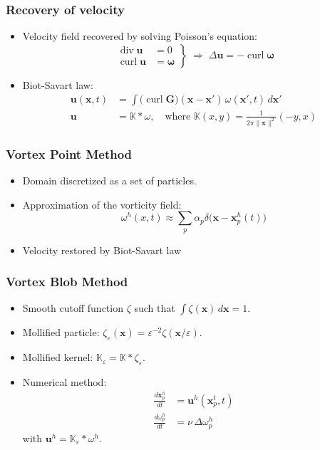\documentclass[12pt,english,dvipsnames]{beamer}
\newcommand{\K}{\mathbb{K}}  %
\renewcommand{\vec}{\mathbf}
\newcommand{\x}{\vec x}      %
\newcommand{\vel}{\vec u}    %
\DeclareMathOperator{\divergence}{div}
\DeclareMathOperator{\curl}{curl}
\providecommand{\norm}[1]{\lVert#1\rVert}
\newcommand{\od}[2]{\frac{d#1}{d#2}}
\begin{document}
  \begin{frame}
    \frametitle{Recovery of velocity}
    \begin{itemize}
      \item Velocity field recovered by solving Poisson's equation:
        \begin{equation}
          \left.
          \begin{split}
            \divergence\vel &= 0 \\
            \curl\vel &= \mathbold\omega
          \end{split}
          \right\}\;\Longrightarrow\;
          Δ\vel = -\curl\mathbold\omega
        \end{equation}
      \item Biot-Savart law:
        \begin{align}
          \vel(\x, t) &=
            \int\bigl(\curl\vec{G}\bigr)(\x - \x')\,ω(\x', t)\,d\x' \\
          \vel &= \K * ω,
            \quad\text{where \(\textstyle\K(x, y) = \frac{1}{2π\norm{\x}^2}(-y, x)\)}
        \end{align}
    \end{itemize}
  \end{frame}

  \begin{frame}
    \frametitle{Vortex Point Method}
    \begin{itemize}
      \item Domain discretized as a set of particles.
      \item Approximation of the vorticity field:
        \begin{equation}
          ω^h(x, t) \approx\sum_p α_p δ\bigl(\x - \x^h_p(t)\bigr)
        \end{equation}
      \item Velocity restored by Biot-Savart law
    \end{itemize}
  \end{frame}

  \begin{frame}
    \frametitle{Vortex Blob Method}
    \begin{itemize}
      \item Smooth cutoff function \(ζ\) such that \(\int ζ(\x)\,d\x = 1\).
      \item Mollified particle: \(ζ_ε(\x) = ε^{-2} ζ(\x/ε)\).
      \item Mollified kernel:   \(\K_ε = \K * ζ_ε\).
      \item Numerical method:
        \begin{align}
          \od{\x^h_p}{t} &= \vel^h(\x^t_p, t) \\
          \od{ω^h_p}{t}    &= ν\,Δω^h_p
        \end{align}
        with \(\vel^h = \K_ε * ω^h\).
    \end{itemize}
  \end{frame}
\end{document}
